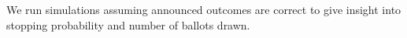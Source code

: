 We run simulations assuming announced outcomes are correct to give insight into stopping probability and number of ballots drawn.
